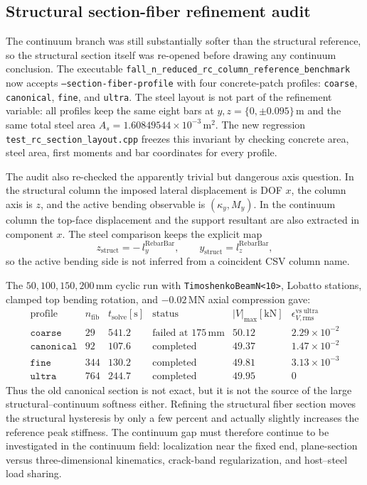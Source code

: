 \subsection{Structural section-fiber refinement audit}

The continuum branch was still substantially softer than the structural
reference, so the structural section itself was re-opened before drawing any
continuum conclusion.  The executable
\texttt{fall\_n\_reduced\_rc\_column\_reference\_benchmark} now accepts
\texttt{--section-fiber-profile} with four concrete-patch profiles:
\texttt{coarse}, \texttt{canonical}, \texttt{fine}, and \texttt{ultra}.  The
steel layout is not part of the refinement variable: all profiles keep the same
eight bars at \(y,z=\{0,\pm0.095\}\,\mathrm{m}\) and the same total steel area
\(A_s=1.60849544\times10^{-3}\,\mathrm{m^2}\).  The new regression
\texttt{test\_rc\_section\_layout.cpp} freezes this invariant by checking
concrete area, steel area, first moments and bar coordinates for every profile.

The audit also re-checked the apparently trivial but dangerous axis question.
In the structural column the imposed lateral displacement is DOF \(x\), the
column axis is \(z\), and the active bending observable is
\((\kappa_y,M_y)\).  In the continuum column the top-face displacement and the
support resultant are also extracted in component \(x\).  The steel comparison
keeps the explicit map
\[
  z_{\mathrm{struct}} = -\,l_y^{\mathrm{RebarBar}}, \qquad
  y_{\mathrm{struct}} = l_z^{\mathrm{RebarBar}},
\]
so the active bending side is not inferred from a coincident CSV column name.

The \(50,100,150,200\,\mathrm{mm}\) cyclic run with
\texttt{TimoshenkoBeamN<10>}, Lobatto stations, clamped top bending rotation,
and \(-0.02\,\mathrm{MN}\) axial compression gave:
\[
\begin{array}{l|r|r|c|c|c}
\text{profile} & n_{\mathrm{fib}} & t_{\mathrm{solve}}[\mathrm{s}] &
\text{status} & |V|_{\max}[\mathrm{kN}] &
\epsilon_{V,\mathrm{rms}}^{\mathrm{vs\ ultra}}\\
\hline
\texttt{coarse} & 29 & 541.2 & \text{failed at }175\,\mathrm{mm} &
50.12 & 2.29\times10^{-2}\\
\texttt{canonical} & 92 & 107.6 & \text{completed} &
49.37 & 1.47\times10^{-2}\\
\texttt{fine} & 344 & 130.2 & \text{completed} &
49.81 & 3.13\times10^{-3}\\
\texttt{ultra} & 764 & 244.7 & \text{completed} &
49.95 & 0
\end{array}
\]
Thus the old canonical section is not exact, but it is not the source of the
large structural--continuum softness either.  Refining the structural fiber
section moves the structural hysteresis by only a few percent and actually
slightly increases the reference peak stiffness.  The continuum gap must
therefore continue to be investigated in the continuum field: localization near
the fixed end, plane-section versus three-dimensional kinematics, crack-band
regularization, and host--steel load sharing.

